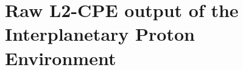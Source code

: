 \documentclass{hitec}
\begin{document}
\newpage
\section{Raw L2-CPE output of the Interplanetary Proton Environment}
\label{App:Raw L2-CPE output of the Interplanetary Proton Environment}



%
%
\end{document}
